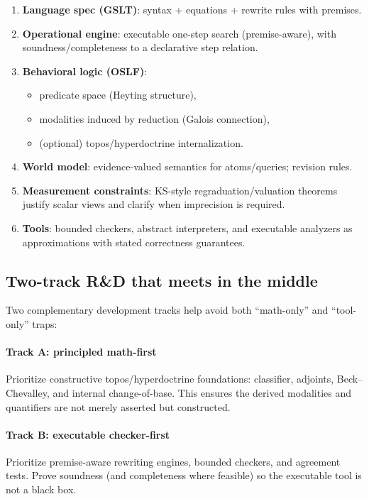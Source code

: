 \documentclass[11pt]{article}
\theoremstyle{definition}
\begin{document}
\begin{enumerate}[leftmargin=1.5em]
\item \textbf{Language spec (GSLT)}: syntax + equations + rewrite rules with premises.
\item \textbf{Operational engine}: executable one-step search (premise-aware), with soundness/completeness to a declarative step relation.
\item \textbf{Behavioral logic (OSLF)}:
  \begin{itemize}[leftmargin=1.5em]
  \item predicate space (Heyting structure),
  \item modalities induced by reduction (Galois connection),
  \item (optional) topos/hyperdoctrine internalization.
  \end{itemize}
\item \textbf{World model}: evidence-valued semantics for atoms/queries; revision rules.
\item \textbf{Measurement constraints}: KS-style regraduation/valuation theorems justify scalar views and clarify when imprecision is required.
\item \textbf{Tools}: bounded checkers, abstract interpreters, and executable analyzers as approximations with stated correctness guarantees.
\end{enumerate}

\subsection{Two-track R\&D that meets in the middle}

Two complementary development tracks help avoid both ``math-only'' and ``tool-only'' traps:

\paragraph{Track A: principled math-first}
Prioritize constructive topos/hyperdoctrine foundations:
classifier, adjoints, Beck--Chevalley, and internal change-of-base.
This ensures the derived modalities and quantifiers are not merely asserted but constructed.

\paragraph{Track B: executable checker-first}
Prioritize premise-aware rewriting engines, bounded checkers, and agreement tests.
Prove soundness (and completeness where feasible) so the executable tool is not a black box.
\end{document}
